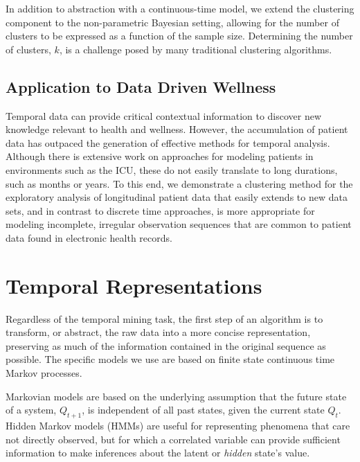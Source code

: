 \documentclass[letterpaper]{article}
\begin{document}
In addition to abstraction with a continuous-time model, we extend the clustering component to the non-parametric Bayesian setting, allowing for the number of clusters to be expressed as a function of the sample size.  Determining the number of clusters, $k$, is a challenge posed by many traditional clustering algorithms.


\subsection{Application to Data Driven Wellness}
\noindent
Temporal data can provide critical contextual information to discover new knowledge relevant to health and wellness.  However, the accumulation of patient data has outpaced the generation of effective methods for temporal analysis.  Although there is extensive work on approaches for modeling patients in environments such as the ICU, these do not easily translate to long durations, such as months or years.  To this end, we demonstrate a clustering method for the exploratory analysis of longitudinal patient data that easily extends to new data sets, and in contrast to discrete time approaches, is more appropriate for modeling incomplete, irregular observation sequences that are common to patient data found in electronic health records.


\section{Temporal Representations}
Regardless of the temporal mining task, the first step of an algorithm is to transform, or abstract, the raw data into a more concise representation, preserving as much of the information contained in the original sequence as possible. The specific models we use are based on finite state continuous time Markov processes.

Markovian models are based on the underlying assumption that the future state of a system, $Q_{t+1}$, is independent of all past states, given the current state $Q_{t}$.  Hidden Markov models (HMMs) are useful for representing phenomena that care not directly observed, but for which a correlated variable can provide sufficient information to make inferences about the latent or \emph{hidden} state's value.
\end{document}
